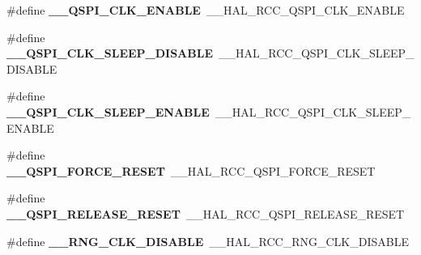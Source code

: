 \begin{DoxyCompactItemize}
\item 
\#define {\bfseries \+\_\+\+\_\+\+Q\+S\+P\+I\+\_\+\+C\+L\+K\+\_\+\+E\+N\+A\+B\+LE}~\+\_\+\+\_\+\+H\+A\+L\+\_\+\+R\+C\+C\+\_\+\+Q\+S\+P\+I\+\_\+\+C\+L\+K\+\_\+\+E\+N\+A\+B\+LE\hypertarget{group___h_a_l___r_c_c___aliased_gadd658ac1a5f1b0813b14856fd20e2cdb}{}\label{group___h_a_l___r_c_c___aliased_gadd658ac1a5f1b0813b14856fd20e2cdb}

\item 
\#define {\bfseries \+\_\+\+\_\+\+Q\+S\+P\+I\+\_\+\+C\+L\+K\+\_\+\+S\+L\+E\+E\+P\+\_\+\+D\+I\+S\+A\+B\+LE}~\+\_\+\+\_\+\+H\+A\+L\+\_\+\+R\+C\+C\+\_\+\+Q\+S\+P\+I\+\_\+\+C\+L\+K\+\_\+\+S\+L\+E\+E\+P\+\_\+\+D\+I\+S\+A\+B\+LE\hypertarget{group___h_a_l___r_c_c___aliased_gaef3881596e019f17e7b5deb7d6d47937}{}\label{group___h_a_l___r_c_c___aliased_gaef3881596e019f17e7b5deb7d6d47937}

\item 
\#define {\bfseries \+\_\+\+\_\+\+Q\+S\+P\+I\+\_\+\+C\+L\+K\+\_\+\+S\+L\+E\+E\+P\+\_\+\+E\+N\+A\+B\+LE}~\+\_\+\+\_\+\+H\+A\+L\+\_\+\+R\+C\+C\+\_\+\+Q\+S\+P\+I\+\_\+\+C\+L\+K\+\_\+\+S\+L\+E\+E\+P\+\_\+\+E\+N\+A\+B\+LE\hypertarget{group___h_a_l___r_c_c___aliased_ga09ad8fbbc31c661c5db651cfec1836ee}{}\label{group___h_a_l___r_c_c___aliased_ga09ad8fbbc31c661c5db651cfec1836ee}

\item 
\#define {\bfseries \+\_\+\+\_\+\+Q\+S\+P\+I\+\_\+\+F\+O\+R\+C\+E\+\_\+\+R\+E\+S\+ET}~\+\_\+\+\_\+\+H\+A\+L\+\_\+\+R\+C\+C\+\_\+\+Q\+S\+P\+I\+\_\+\+F\+O\+R\+C\+E\+\_\+\+R\+E\+S\+ET\hypertarget{group___h_a_l___r_c_c___aliased_ga65b316ad66777e7a13f89e3bb6d6cd7e}{}\label{group___h_a_l___r_c_c___aliased_ga65b316ad66777e7a13f89e3bb6d6cd7e}

\item 
\#define {\bfseries \+\_\+\+\_\+\+Q\+S\+P\+I\+\_\+\+R\+E\+L\+E\+A\+S\+E\+\_\+\+R\+E\+S\+ET}~\+\_\+\+\_\+\+H\+A\+L\+\_\+\+R\+C\+C\+\_\+\+Q\+S\+P\+I\+\_\+\+R\+E\+L\+E\+A\+S\+E\+\_\+\+R\+E\+S\+ET\hypertarget{group___h_a_l___r_c_c___aliased_gac6cfbe77cce17109359af09ea38d6650}{}\label{group___h_a_l___r_c_c___aliased_gac6cfbe77cce17109359af09ea38d6650}

\item 
\#define {\bfseries \+\_\+\+\_\+\+R\+N\+G\+\_\+\+C\+L\+K\+\_\+\+D\+I\+S\+A\+B\+LE}~\+\_\+\+\_\+\+H\+A\+L\+\_\+\+R\+C\+C\+\_\+\+R\+N\+G\+\_\+\+C\+L\+K\+\_\+\+D\+I\+S\+A\+B\+LE\hypertarget{group___h_a_l___r_c_c___aliased_gacd4f0db00b9c80187765853cc9ff04a2}{}\label{group___h_a_l___r_c_c___aliased_gacd4f0db00b9c80187765853cc9ff04a2}


\end{DoxyCompactItemize}
